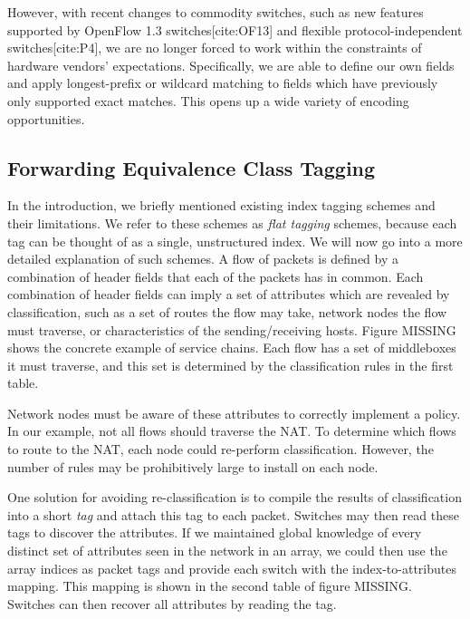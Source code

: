   However, with recent changes to commodity switches, such as new features supported by OpenFlow 1.3 switches[cite:OF13] and flexible protocol-independent switches[cite:P4], we are no longer forced to work within the constraints of hardware vendors' expectations. Specifically, we are able to define our own fields and apply longest-prefix or wildcard matching to fields which have previously only supported exact matches. This opens up a wide variety of encoding opportunities.

\subsection{Forwarding Equivalence Class Tagging}
  
In the introduction, we briefly mentioned existing index tagging schemes and their limitations. We refer to these schemes as \textit{flat tagging} schemes, because each tag can be thought of as a single, unstructured index.  We will now go into a more detailed explanation of such schemes. A flow of packets is defined by a combination of header fields that each of the packets has in common. Each combination of header fields can imply a set of attributes which are revealed by classification, such as a set of routes the flow may take, network nodes the flow must traverse, or characteristics of the sending/receiving hosts. 
Figure MISSING shows the concrete example of service chains. Each flow has a set of middleboxes it must traverse, and this set is determined by the classification rules in the first table.

Network nodes must be aware of these attributes to correctly implement a policy. In our example, not all flows should traverse the NAT. To determine which flows to route to the NAT, each node could re-perform classification. However, the number of rules may be prohibitively large to install on each node. 

One solution for avoiding re-classification is to compile the results of classification into a short \textit{tag} and attach this tag to each packet. Switches may then read these tags to discover the attributes. If we maintained global knowledge of every distinct set of attributes seen in the network in an array, we could then use the array indices as packet tags and provide each switch with the index-to-attributes mapping. This mapping is shown in the second table of figure MISSING. Switches can then recover all attributes by reading the tag. 


